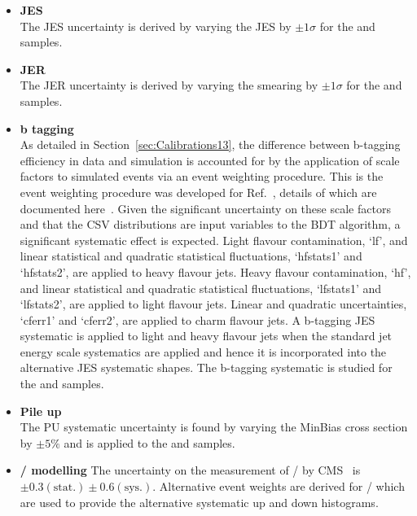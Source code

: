 \begin{itemize}
\item \textbf{JES}\\
The JES uncertainty is derived by varying the JES by $\pm1\sigma$ for the \ttbar and \tttt samples.
\item \textbf{JER}\\
The JER uncertainty is derived by varying the smearing by $\pm1\sigma$ for the \ttbar and \tttt samples.
\item \textbf{b tagging}\\
As detailed in Section~\ref{sec:Calibrations13}, the difference between b-tagging efficiency in data and simulation is accounted for by the application of scale factors to simulated events via an event weighting procedure. This is the event weighting procedure was developed for Ref.~\cite{CMS-PAS-HIG-16-004}, details of which are documented here~\cite{CMS-NOTE-2013-130}. Given the significant uncertainty on these scale factors and that the CSV distributions are input variables to the BDT algorithm, a significant systematic effect is expected. Light flavour contamination, `lf', and linear statistical and quadratic statistical fluctuations, `hfstats1' and `hfstats2', are applied to heavy flavour jets. Heavy flavour contamination, `hf', and linear statistical and quadratic statistical fluctuations, `lfstats1' and `lfstats2', are applied to light flavour jets. Linear and quadratic uncertainties, `cferr1' and `cferr2', are applied to charm flavour jets. A b-tagging JES systematic is applied to light and heavy flavour jets when the standard jet energy scale systematics are applied and hence it is incorporated into the alternative JES systematic shapes. The b-tagging systematic is studied for the \ttbar and \tttt samples.
\item \textbf{Pile up}\\
The PU systematic uncertainty is found by varying the MinBias cross section by $\pm5\%$ and is applied to the \ttbar and \tttt samples.
\item \textbf{\heavyflavourone / \heavyflavourtwo modelling}
The uncertainty on the measurement of \heavyflavourone / \heavyflavourtwo by CMS~\cite{Khachatryan2015132} is $\pm 0.3 \left( \textrm{stat.} \right) \pm 0.6 \left(\textrm{sys.} \right)$. Alternative event weights are derived for \heavyflavourone / \heavyflavourtwo which are used to provide the alternative systematic up and down histograms.
\end{itemize}


